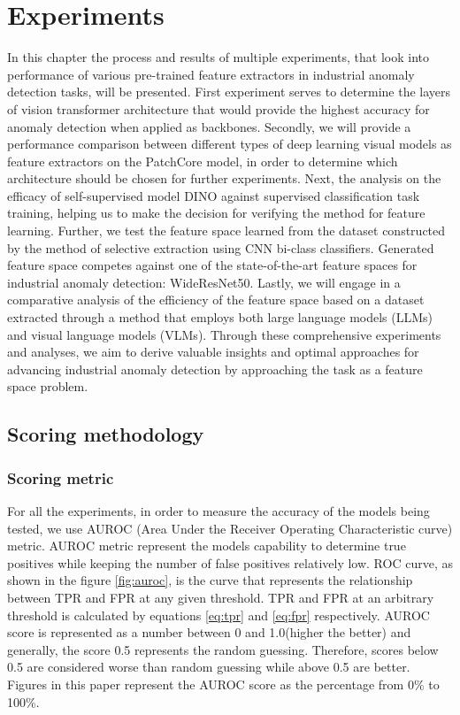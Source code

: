 \chapter{Experiments}
\label{chapter:ch4}

In this chapter the process and results of multiple experiments, that look into performance of various pre-trained feature extractors in industrial anomaly detection tasks, will be presented. First experiment serves to determine the layers of vision transformer architecture that would provide the highest accuracy for anomaly detection when applied as backbones. Secondly, we will provide a performance comparison between different types of deep learning visual models as feature extractors on the PatchCore model, in order to determine which architecture should be chosen for further experiments. Next, the analysis on the efficacy of self-supervised model DINO against supervised classification task training, helping us to make the decision for verifying the method for feature learning. Further, we test the feature space learned from the dataset constructed by the method of selective extraction using CNN bi-class classifiers. Generated feature space competes against one of the state-of-the-art feature spaces for industrial anomaly detection: WideResNet50. Lastly, we will engage in a comparative analysis of the efficiency of the feature space based on a dataset extracted through a method that employs both large language models (LLMs) and visual language models (VLMs). Through these comprehensive experiments and analyses, we aim to derive valuable insights and optimal approaches for advancing industrial anomaly detection by approaching the task as a feature space problem.

\section{Scoring methodology}

\subsection{Scoring metric}
For all the experiments, in order to measure the accuracy of the models being tested, we use AUROC (Area Under the Receiver Operating Characteristic curve) metric. AUROC metric represent the models capability to determine true positives while keeping the number of false positives relatively low. ROC curve, as shown in the figure \ref{fig:auroc}, is the curve that represents the relationship between TPR and FPR at any given threshold. TPR and FPR at an arbitrary threshold is calculated by equations \ref{eq:tpr} and \ref{eq:fpr} respectively. AUROC score is represented as a number between 0 and 1.0(higher the better) and generally, the score 0.5 represents the random guessing. Therefore, scores below 0.5 are considered worse than random guessing while above 0.5 are better. Figures in this paper represent the AUROC score as the percentage from 0\% to 100\%.


